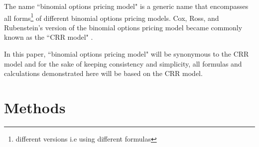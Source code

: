 \documentclass[12pt, letterpaper]{article}
\begin{document}
\medskip

The name ``binomial options pricing model" is a generic name that encompasses all forms\footnote{different versions i.e using different formulas} of different binomial options pricing models.
Cox, Ross, and Rubenstein's version of the binomial options pricing model became commonly known as the ``CRR model" \cite{thebinomialmodelcornell}.

\medskip

In this paper, ``binomial options pricing model" will be synonymous to the CRR model and for the sake of keeping consistency and simplicity, all formulas and calculations demonstrated here will be based on the CRR model.

\pagebreak

\section*{Methods}
\end{document}
